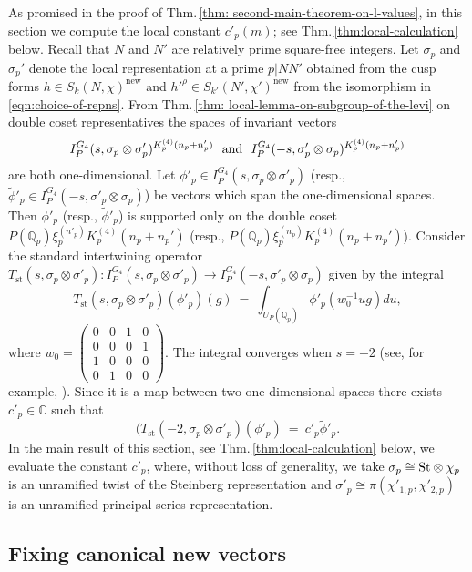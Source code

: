 \documentclass[11pt]{amsart}
\newcommand{\mirp}[1]{K_p^{(4)}(#1)}
\begin{document}
As promised in the proof of Thm.\,\ref{thm: second-main-theorem-on-l-values}, in this section we 
compute the local constant $c'_p(m)$; see Thm.\,\ref{thm:local-calculation} below. 
Recall that $N$ and $N'$ are relatively prime square-free integers. 
Let $\sigma_p$ and $\sigma_p'$ denote the local representation at a prime $p|NN'$ obtained from the cusp forms 
$h \in S_k(N,\chi)^{\text{new}}$ and $h'^\rho \in S_{k'}(N',\chi')^{\text{new}}$ from the isomorphism in \eqref{eqn:choice-of-repns}. 
From Thm.\,\ref{thm: local-lemma-on-subgroup-of-the-levi} on double coset representatives the spaces of invariant vectors 
$$I_P^{G_4}(s, \sigma_p \otimes \sigma'_p)^{\mirp{n_p + n'_p}} \ \ {\rm and} \ \ 
I_P^{G_4}(-s, \sigma'_p \otimes \sigma_p)^{\mirp{n_p + n'_p}}$$ 
are both one-dimensional. 
Let $\phi'_p \in I_P^{G_4}(s, \sigma_p \otimes \sigma'_p)$ 
(resp., $\tilde{\phi}'_p \in I_P^{G_4}(-s, \sigma'_p \otimes \sigma_p)$) be vectors which span the one-dimensional spaces. 
Then $\phi'_p$ (resp., $\tilde{\phi}'_p$) is supported only on the double coset 
$P(\mathbb{Q}_p) \xi_p^{(n'_p)} \mirp{n_p + n_p'}$ (resp., $P(\mathbb{Q}_p) \xi_p^{(n_p)} \mirp{n_p + n_p'}$). 
Consider the standard intertwining operator
$T_{\text{st}}(s,\sigma_p \otimes \sigma'_p) : I_P^{G_4}(s, \sigma_p \otimes \sigma'_p) \rightarrow 
I_P^{G_4}(-s, \sigma'_p \otimes \sigma_p)$ given by the integral 
$$
T_{\text{st}}(s, \sigma_p \otimes \sigma'_p)(\phi'_p)(g) \ = \ \int_{U_P(\mathbb{Q}_p)} \phi'_p(w_0^{-1}u g) du,
$$
where 
$w_0 = \left(\begin{smallmatrix}
	0 & 0 & 1 & 0\\ 0& 0& 0 & 1\\ 1& 0 & 0 & 0 \\ 0 & 1 & 0 & 0
\end{smallmatrix}\right).$
The integral converges when $s=-2$ (see, for example, \cite{harder-raghuram}). Since it is a map between two one-dimensional spaces 
there exists $c'_p \in \mathbb{C}$ such that 
$$
(T_{\text{st}}(-2, \sigma_p \otimes \sigma'_p)(\phi'_p) \ = \ c'_p \tilde{\phi}'_p.
$$
In the main result of this section, see Thm.\,\ref{thm:local-calculation} below, 
we evaluate the constant $c'_p$, where, without loss of generality, we take $\sigma_p \cong \textup{St}\otimes \chi_p$ 
is an unramified twist of the Steinberg representation and $\sigma'_p \cong \pi(\chi'_{1,p}, \chi'_{2,p})$ is an unramified principal series representation.


\subsection{Fixing canonical new vectors}
\end{document}
